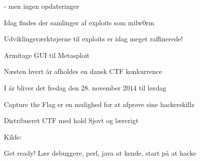 \documentclass[20pt,landscape,a4paper,footrule]{foils}
\begin{document}


\centerline{ - men ingen opdateringer}



\centerline{}





\begin{list1}
\item Idag findes der samlinger af exploits som milw0rm
\item Udviklingsværktøjerne til exploits er idag meget raffinerede!
\item {}
\item {} Armitage GUI til Metasploit
\item {}
\end{list1}






\begin{list1}
\item Næsten hvert år afholdes en dansk CTF konkurrence 
\item I år bliver det fredag den 28. november 2014 til lørdag
\item Capture the Flag er en mulighed for at afprøve sine hackerskillz
\item Distribueret CTF med hold  Sjovt og lærerigt 
\end{list1}
Kilde: 

\centerline{Get ready! Lær debuggere, perl, java at kende, start på at hacke}




\myquestionspage



\end{document}
